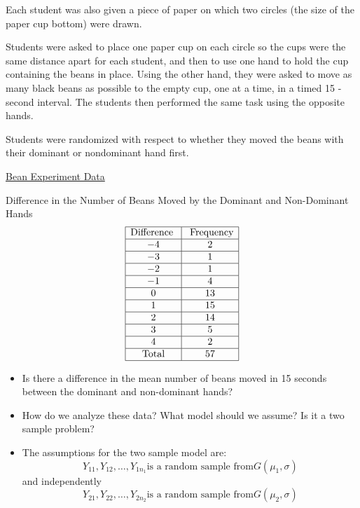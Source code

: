 Each student was also given a piece of paper on which two circles
(the size of the paper cup bottom) were drawn.

Students were asked to place one paper cup on each circle so the cups were the same distance
apart for each student, and then to use one hand to hold the cup containing the beans in place.
Using the other hand, they were asked to move as many black beans as possible to the empty
cup, one at a time, in a timed 15 -second interval. The students then performed the same
task using the opposite hands.

Students were randomized with respect to whether they moved the beans with
their dominant or nondominant hand first.

\underline{Bean Experiment Data}

Difference in the Number of Beans Moved by the Dominant and
Non-Dominant Hands
\[ \begin{array}{|c|c|}
        \hline
        \text{Difference } & \text{ Frequency} \\
        \hline
        -4                 & 2                 \\
        \hline
        -3                 & 1                 \\
        \hline
        -2                 & 1                 \\
        \hline
        -1                 & 4                 \\
        \hline
        0                  & 13                \\
        \hline
        1                  & 15                \\
        \hline
        2                  & 14                \\
        \hline
        3                  & 5                 \\
        \hline
        4                  & 2                 \\
        \hline
        \text{Total}       & 57                \\
        \hline
    \end{array} \]
\begin{itemize}
    \item Is there a difference in the mean number of beans moved in 15 seconds between the dominant and non-dominant hands?
    \item How do we analyze these data? What model should we assume? Is it a two sample problem?
    \item The assumptions for the two sample model are:
          \[Y_{11}, Y_{12}, \ldots, Y_{1 n_{1}} \text{is a random sample from} G\left(\mu_{1}, \sigma\right)\]
          and independently
          \[Y_{21}, Y_{22}, \ldots, Y_{2 n_{2}} \text{is a random sample from} G\left(\mu_{2}, \sigma\right)\]
\end{itemize}

